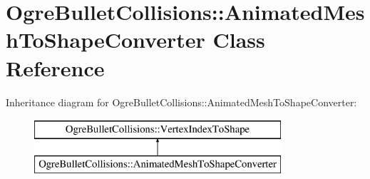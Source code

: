 \hypertarget{class_ogre_bullet_collisions_1_1_animated_mesh_to_shape_converter}{\section{Ogre\-Bullet\-Collisions\-:\-:Animated\-Mesh\-To\-Shape\-Converter Class Reference}
\label{class_ogre_bullet_collisions_1_1_animated_mesh_to_shape_converter}
}
Inheritance diagram for Ogre\-Bullet\-Collisions\-:\-:Animated\-Mesh\-To\-Shape\-Converter\-:\begin{figure}[H]
\begin{center}
\leavevmode
\includegraphics[height=2.000000cm]{class_ogre_bullet_collisions_1_1_animated_mesh_to_shape_converter}
\end{center}
\end{figure}
